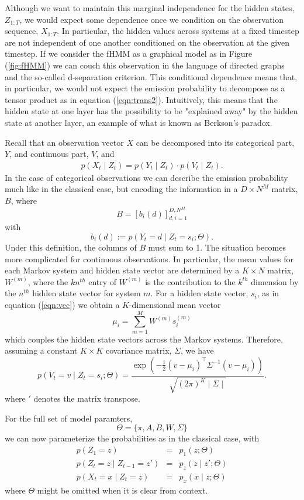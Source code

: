 \documentclass{amsart}
\begin{document}
Although we want to maintain this marginal independence for the hidden states, 
$Z_{1:T}$, we would expect some dependence once we condition on the observation 
sequence, $X_{1:T}$.  In particular, the hidden values across systems 
at a fixed timestep are not independent of one another conditioned on 
the observation at the given timestep. If we consider 
the fHMM as a graphical model as in Figure (\ref{fig:fHMM}) we can couch this 
observation in the language of directed graphs and the so-called d-separation 
criterion. This conditional dependence means that, in particular, we would not expect the 
emission probability to decompose as a tensor product as in equation 
(\ref{eqn:trans2}). Intuitively, this means that the hidden state at 
one layer has the possibility to be "explained away" by the hidden 
state at another layer, an example of what is known as Berkson's 
paradox. 

Recall that an observation vector $X$ can be decomposed into its 
categorical part, $Y$, and continuous part, $V$, and 
\begin{eqnarray}
p(X_t\mid Z_t) = p(Y_t\mid Z_t)\cdot p(V_t\mid Z_t).
\end{eqnarray}
In the case of categorical observations we can 
describe the emission probability much like in the classical case, but encoding 
the information in a $D\times N^M$ matrix, $B$, where 
\[
B = \left[b_{i}(d)\right]_{d,i=1}^{D,N^M}
\]
with 
\[
b_{i}(d) := p(Y_t=d\mid Z_t = s_i;\Theta).
\]
Under this definition, the columns of $B$ must sum to 1. The situation becomes more complicated for continuous observations.  In 
particular, the mean values for each Markov system and hidden state vector are 
determined by a $K\times N$ matrix, $W^{(m)}$, where the $kn^{th}$ entry 
of $W^{(m)}$ is the contribution to the $k^{th}$ dimension by the $n^{th}$ 
hidden state vector for system $m$. For a hidden state vector, $s_i$, as in 
equation (\ref{eqn:vec}) we obtain a $K$-dimensional mean vector
\[
\mu_i = \sum_{m=1}^M W^{(m)}s_i^{(m)}
\]
which couples the hidden state vectors across the Markov systems.
Therefore, assuming a constant $K\times K$ covariance matrix, $\Sigma$, we have 
\[
p(V_t = v\mid Z_t = s_i;\Theta) = 
\frac{\exp\left(-\frac{1}{2}\left(v-\mu_i\right)^\intercal\Sigma^{-1}\left(v-\mu_i\right)\right)}{\sqrt{(2\pi)^K\mid \Sigma\mid}}.
\]
where $'$ denotes the matrix transpose.  

For the full set of model paramters, 
\[
\Theta = \{\pi,A,B,W,\Sigma\}
\]
we can now parameterize the probabilities as in the classical case, 
with
\begin{eqnarray*}
p(Z_1 = z) & = & p_1(z;\Theta)\\
p(Z_t = z\mid Z_{t-1} = z') & = & p_z(z\mid z';\Theta)\\
p(X_t = x\mid Z_t = z) & = & p_x(x\mid z;\Theta)
\end{eqnarray*}
where $\Theta$ might be omitted when it is clear from context.
\end{document}
